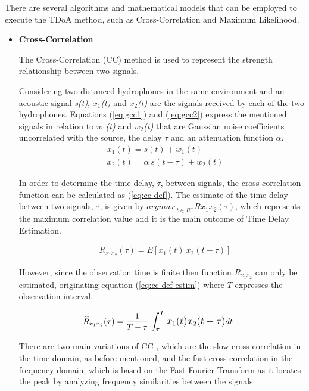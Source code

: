 There are several algorithms and mathematical models that can be employed to execute the TDoA method, such as Cross-Correlation and Maximum Likelihood.

\begin{itemize}
	\item \textbf{Cross-Correlation}

The Cross-Correlation (CC) method  is used to represent the strength relationship between two signals. 

Considering two distanced hydrophones in the same environment and an acoustic signal \textit{s(t)}, \textit{$x_1$(t)} and \textit{$x_2$(t)} are the signals received by each of the two hydrophones. Equations (\ref{eq:gcc1}) and (\ref{eq:gcc2})\cite{crosscorr-76} express the mentioned signals in relation to \textit{$w_1$(t)} and \textit{$w_2$(t)} that are Gaussian noise coefficients uncorrelated with the source, the delay $\tau$ and an attenuation function $\alpha$.
\begin{eqnarray}
	&x_1(t) = s(t) + w_1(t)
	\label{eq:gcc1}\\
	&x_2(t) = \alpha \ s(t - \tau) + w_2(t)
	\label{eq:gcc2}
\end{eqnarray}

In order to determine the time delay, $\tau$, between signals, the cross-correlation function can be calculated as (\ref{eq:cc-def}). The estimate of the time delay between two signals, $\tau$, is given by $arg max_{\ t\in R^+} Rx_1x_2(\tau)$, which represents the maximum correlation value and it is the main outcome of Time Delay Estimation. 

\begin{eqnarray}
&R_{x_1x_2}(\tau) = E[x_1(t) \ x_2(t- \tau)]
\label{eq:cc-def}
\end{eqnarray}

However, since the observation time is finite then function $R_{x_1x_2}$ can only be estimated, originating equation (\ref{eq:cc-def-estim}) where $T$ expresses the observation interval.

\begin{eqnarray}
&\widehat R_{x_1x_2}(\tau) = \frac{1}{T - \tau} \ \mathlarger{\int_{\tau}^{T} x_1(t)x_2(t - \tau)} dt
\label{eq:cc-def-estim}
\end{eqnarray}
	
There are two main variations of CC \cite{crosscorr}, which are the slow cross-correlation in the  time domain, as before mentioned, and the fast cross-correlation in the frequency domain, which is based on the Fast Fourier Transform as it locates the peak by analyzing frequency similarities between the signals. 
	

\end{itemize}
